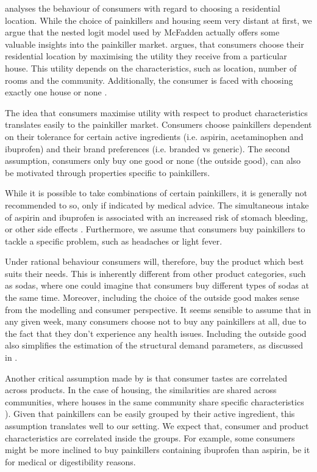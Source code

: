 \documentclass[12pt, authoryear]{elsarticle}
\begin{document}
\cite{mcfadden1978modeling} analyses the behaviour of consumers with regard to choosing a residential location. While the choice of painkillers and housing seem very distant at first, we argue that the nested logit model used by McFadden actually offers some valuable insights into the painkiller market. \cite{mcfadden1978modeling}  argues, that consumers choose their residential location by maximising the utility they receive from a particular house. This utility depends on the characteristics, such as location, number of rooms and the community. Additionally, the consumer is faced with choosing exactly one house or none \citep{mcfadden1978modeling}.

The idea that consumers maximise utility with respect to product characteristics translates easily to the painkiller market. Consumers choose painkillers dependent on their tolerance for certain active ingredients (i.e. aspirin, acetaminophen and ibuprofen) and their brand preferences (i.e. branded vs generic). The second assumption, consumers only buy one good or none (the outside good), can also be motivated through properties specific to painkillers.

While it is possible to take combinations of certain painkillers, it is generally not recommended to so, only if indicated by medical advice. The simultaneous intake of aspirin and ibuprofen is associated with an increased risk of stomach bleeding, or other side effects  \citep{miller1981combination}. Furthermore, we assume that consumers buy painkillers to tackle a specific problem, such as headaches or light fever.

Under rational behaviour consumers will, therefore, buy the product which best suits their needs. This is inherently different from other product categories, such as sodas, where one could imagine that consumers buy different types of sodas at the same time. Moreover, including the choice of the outside good makes sense from the modelling and consumer perspective. It seems sensible to assume that in any given week, many consumers choose not to buy any painkillers at all, due to the fact that they don’t experience any health issues. Including the outside good also simplifies the estimation of the structural demand parameters, as discussed in \cite{berry1994estimating}.

Another critical assumption made by \cite{mcfadden1978modeling} is that consumer tastes are correlated across products. In the case of housing, the similarities are shared across communities, where houses in the same community share specific characteristics \citep{mcfadden1978modeling}). Given that painkillers can be easily grouped by their active ingredient, this assumption translates well to our setting. We expect that, consumer and product characteristics are correlated inside the groups. For example, some consumers might be more inclined to buy painkillers containing ibuprofen than aspirin, be it for medical or digestibility reasons.
\end{document}

